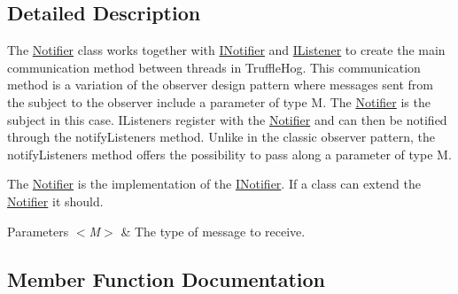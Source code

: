 \subsection{Detailed Description}
The \hyperlink{classedu_1_1kit_1_1trufflehog_1_1util_1_1_notifier}{Notifier} class works together with \hyperlink{interfaceedu_1_1kit_1_1trufflehog_1_1util_1_1_i_notifier}{I\+Notifier} and \hyperlink{interfaceedu_1_1kit_1_1trufflehog_1_1util_1_1_i_listener}{I\+Listener} to create the main communication method between threads in Truffle\+Hog. This communication method is a variation of the observer design pattern where messages sent from the subject to the observer include a parameter of type M. The \hyperlink{classedu_1_1kit_1_1trufflehog_1_1util_1_1_notifier}{Notifier} is the subject in this case. I\+Listeners register with the \hyperlink{classedu_1_1kit_1_1trufflehog_1_1util_1_1_notifier}{Notifier} and can then be notified through the notify\+Listeners method. Unlike in the classic observer pattern, the notify\+Listeners method offers the possibility to pass along a parameter of type M. 

The \hyperlink{classedu_1_1kit_1_1trufflehog_1_1util_1_1_notifier}{Notifier} is the implementation of the \hyperlink{interfaceedu_1_1kit_1_1trufflehog_1_1util_1_1_i_notifier}{I\+Notifier}. If a class can extend the \hyperlink{classedu_1_1kit_1_1trufflehog_1_1util_1_1_notifier}{Notifier} it should. 


\begin{DoxyParams}{Parameters}
{\em $<$\+M$>$} & The type of message to receive. \\
\hline
\end{DoxyParams}


\subsection{Member Function Documentation}
\hypertarget{classedu_1_1kit_1_1trufflehog_1_1util_1_1_notifier_af076d7bc5d02b148215dc75674ae9aae}{}
